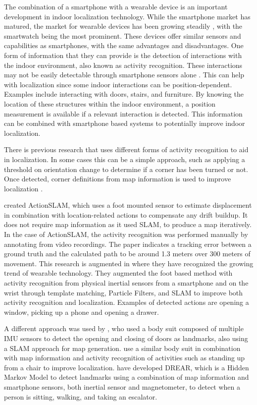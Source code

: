 The combination of a smartphone with a wearable device is an important development in indoor localization technology. While the smartphone market has matured, the market for wearable devices has been growing steadily \cite{jung2016consumer}, with the smartwatch being the most prominent. These devices offer similar sensors and capabilities as smartphones, with the same advantages and disadvantages. One form of information that they can provide is the detection of interactions with the indoor environment, also known as activity recognition. These interactions may not be easily detectable through smartphone sensors alone \cite{Shoaib2015}. This can help with localization since some indoor interactions can be position-dependent. Examples include interacting with doors, stairs, and furniture. By knowing the location of these structures within the indoor environment, a position measurement is available if a relevant interaction is detected. This information can be combined with smartphone based systems to potentially improve indoor localization.

There is previous research that uses different forms of activity recognition to aid in localization. In some cases this can be a simple approach, such as applying a threshold on orientation change to determine if a corner has been turned or not. Once detected, corner definitions from map information is used to improve localization \cite{Gu2019,Jackermeier2018}. \par 
\citet{Hardegger2012} created ActionSLAM, which uses a foot mounted sensor to estimate displacement in combination with location-related actions to compensate any drift buildup. It does not require map information as it used \ac{SLAM}, to produce a map iteratively. In the case of ActionSLAM, the activity recognition was performed manually by annotating from video recordings. The paper indicates a tracking error between a ground truth and the calculated path to be around 1.3 meters over 300 meters of movement. This research is augmented in \citet{Hardegger2016} where they have recognized the growing trend of wearable technology. They augmented the foot based method with activity recognition from physical inertial sensors from a smartphone and on the wrist through template matching, Particle Filters, and \ac{SLAM} to improve both activity recognition and localization. Examples of detected actions are opening a window, picking up a phone and opening a drawer. \par
A different approach was used by \citet{Grzonka2010}, who used a body suit composed of multiple \ac{IMU} sensors to detect the opening and closing of doors as landmarks, also using a \ac{SLAM} approach for map generation. \citet{Altun2012} use a similar body suit in combination with map information and activity recognition of activities such as standing up from a chair to improve localization. \citet{Torok2014} have developed DREAR, which is a Hidden Markov Model to detect landmarks using a combination of map information and smartphone sensors, both inertial sensor and magnetometer, to detect when a person is sitting, walking, and taking an escalator.

